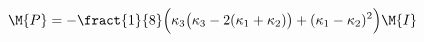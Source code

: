 \begin{equation}
\M{P} = -\fract{1}{8}\Bigl(\kappa_3\bigl(\kappa_3-2(\kappa_1+\kappa_2)\bigr) +
(\kappa_1-\kappa_2)^2\Bigr)\M{I} 
\label{2.27}
\end{equation}

